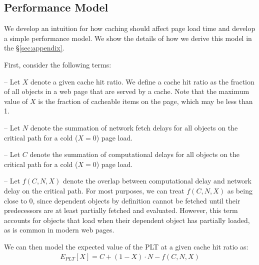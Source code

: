 

\subsection{Performance Model}
\label{subsec:model}

We develop an intuition for how caching should affect page load
time and develop a simple performance model. We show the details of how we derive
this model in the \S\ref{sec:appendix}.

First, consider the following terms:

\noindent-- Let $X$ denote a given cache hit ratio. We define a cache hit ratio as the fraction
of all objects in a web page that are served by a cache. Note that the maximum
value of $X$ is the fraction of cacheable items on the page, which may be less than 1.

\noindent-- Let $N$ denote the summation of network fetch delays for all objects on the
critical path for a cold ($X=0$) page load.

\noindent-- Let $C$ denote the summation of computational delays for all
objects on the critical path for a cold ($X=0$) page load.

\noindent-- Let $f(C,N,X)$ denote the overlap between computational delay and
network delay on the critical path. For most purposes, we can treat $f(C,N,X)$
as being close to 0, since dependent objects by definition cannot be fetched
until their predecessors are at least partially fetched and evaluated.
However, this term accounts for objects that load when their dependent object has partially loaded, as is common in modern web pages.

We can then model the expected value of the PLT at a given cache hit ratio as:
\begin{align*}
E_{PLT}[X] = C + (1 - X) \cdot N - f(C,N,X)
\end{align*}


